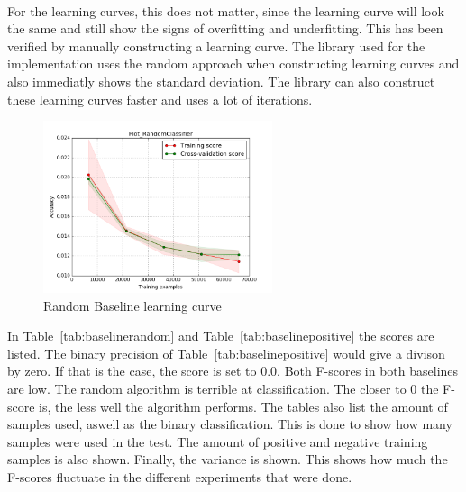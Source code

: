 \\
For the learning curves, this does not matter, since the learning curve will look the same and still show the signs of overfitting and underfitting. This has been verified by manually constructing a learning curve. The library used for the implementation uses the random approach when constructing learning curves and also immediatly shows the standard deviation. The library can also construct these learning curves faster and uses a lot of iterations. 

\begin{figure}[H]
\centering
\includegraphics[width=0.6\textwidth]{Figures/Plot_RandomClassifier}
\decoRule
\caption[Random Baseline learning curve]{Random Baseline learning curve}
\label{fig:randombaseline}
\end{figure}

\noindent In Table~\ref{tab:baselinerandom} and Table~\ref{tab:baselinepositive} the scores are listed. The binary precision of Table~\ref{tab:baselinepositive} would give a divison by zero. If that is the case, the score is set to $0.0$. Both F-scores in both baselines are low. The random algorithm is terrible at classification. The closer to $0$ the F-score is, the less well the algorithm performs. The tables also list the amount of samples used, aswell as the binary classification. This is done to show how many samples were used in the test. The amount of positive and negative training samples is also shown. Finally, the variance is shown. This shows how much the F-scores fluctuate in the different experiments that were done.

